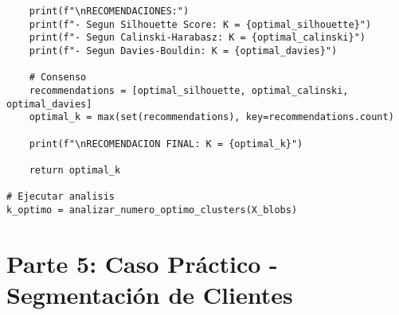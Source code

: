 \documentclass[12pt]{article}
\begin{document}
\begin{lstlisting}
    print(f"\nRECOMENDACIONES:")
    print(f"- Segun Silhouette Score: K = {optimal_silhouette}")
    print(f"- Segun Calinski-Harabasz: K = {optimal_calinski}") 
    print(f"- Segun Davies-Bouldin: K = {optimal_davies}")
    
    # Consenso
    recommendations = [optimal_silhouette, optimal_calinski, optimal_davies]
    optimal_k = max(set(recommendations), key=recommendations.count)
    
    print(f"\nRECOMENDACION FINAL: K = {optimal_k}")
    
    return optimal_k

# Ejecutar analisis
k_optimo = analizar_numero_optimo_clusters(X_blobs)
\end{lstlisting}

\section{Parte 5: Caso Práctico - Segmentación de Clientes}
\end{document}

